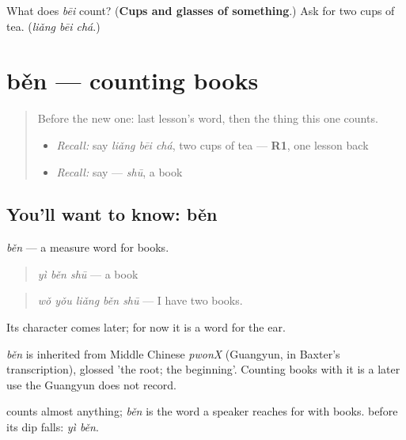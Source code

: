 \begin{tcolorbox}[breakable,colback=teal!4,colframe=teal!35!black,title={Before you move on}]
What does \emph{bēi} count? (\textbf{Cups and glasses of something}.) Ask for two cups of tea. (\emph{liǎng bēi chá}.)
\end{tcolorbox}
\section[běn]{běn — counting books}

\label{lesson:ZH-C88-ben}



\begin{quote}
Before the new one: last lesson's word, then the thing this one counts.

\begin{itemize}
\raggedright
  \item \emph{Recall:} say \emph{liǎng bēi chá}, two cups of tea — \textbf{R1}, one lesson back
  \item \emph{Recall:} say  — \emph{shū}, a book
\end{itemize}
\end{quote}

\subsection*{You'll want to know: běn}
\emph{běn} — a measure word for books.

\begin{quote}
\emph{yì běn shū} — a book
\end{quote}

\begin{quote}
\emph{wǒ yǒu liǎng běn shū} — I have two books.
\end{quote}

Its character comes later; for now it is a word for the ear.

\begin{cousinweb}
\emph{běn} is inherited from Middle Chinese \emph{pwonX} (Guangyun, in Baxter's transcription), glossed 'the root; the beginning'. Counting books with it is a later use the Guangyun does not record.
\end{cousinweb}

\begin{grammarlens}[title={What you've built}]
 counts almost anything; \emph{běn} is the word a speaker reaches for with books.  before its dip falls: \emph{yì běn}.
\end{grammarlens}

